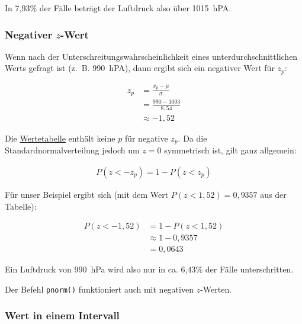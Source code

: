 \documentclass[
  11pt,
  ngerman,
  a4paper,
]{report}
\newenvironment{rtip}{
  \medskip
  \begin{tcolorbox}[colframe=purple,colback=light_gray,title=Softwarehinweis]
}{
  \end{tcolorbox}
  \medskip
}
\begin{document}
In 7,93\% der Fälle beträgt der Luftdruck also über 1015~hPA.

\hypertarget{negativer-z-wert}{%
\subsubsection{\texorpdfstring{Negativer \(z\)-Wert}{Negativer z-Wert}}\label{negativer-z-wert}}

Wenn nach der Unterschreitungswahrscheinlichkeit eines unterdurchschnittlichen Werts gefragt ist (z.~B. 990~hPA), dann ergibt sich ein negativer Wert für \(z_p\):

\begin{equation}
  \begin{aligned}
    z_p &= \frac{x_p-\mu}{\sigma} \\[4pt]
        &= \frac{990-1003}{8{,}54} \\[4pt]
        &\approx -1{,}52
  \end{aligned}
\end{equation}

Die \protect\hyperlink{tabell-z}{Wertetabelle} enthält keine \(p\) für negative \(z_p\). Da die Standardnormalverteilung jedoch um \(z=0\) symmetrisch ist, gilt ganz allgemein:

\[
  \begin{aligned}
    P(z < -z_p) = 1 - P(z < z_p)
  \end{aligned}
  \label{eq:neg}
\]

Für unser Beispiel ergibt sich (mit dem Wert \(P(z < 1,52) = 0{,}9357\) aus der Tabelle):

\[
  \begin{aligned}
    P(z < -1,52) &= 1 - P(z < 1,52) \\
    &\approx 1-0{,}9357 \\
    &=0{,}0643
  \end{aligned}
\]

Ein Luftdruck von 990~hPa wird also nur in ca. 6,43\% der Fälle unterschritten.

\begin{rtip}
Der Befehl \verb|pnorm()| funktioniert auch mit negativen $z$-Werten.
\end{rtip}

\hypertarget{wert-in-einem-intervall}{%
\subsubsection{Wert in einem Intervall}\label{wert-in-einem-intervall}}
\end{document}

